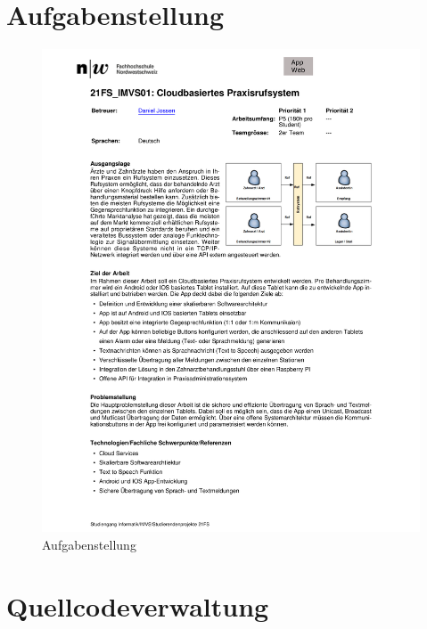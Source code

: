 \renewcommand\refname{Literaturverzeichnis}
\printbibliography
\cleardoublepage
\listoffigures

\appendix

\section{Aufgabenstellung}\label{sec:aufgabenstellung}
\begin{figure}[h]
    \centering
    \begin{minipage}[b]{0.8\textwidth}
        \includegraphics[width=\textwidth]{graphics/aufgabenstellung}
        \caption{Aufgabenstellung}
    \end{minipage}\label{fig:aufgabenstellung}
\end{figure}

\clearpage

\section{Quellcodeverwaltung}\label{sec:quellcodeverwaltung}

